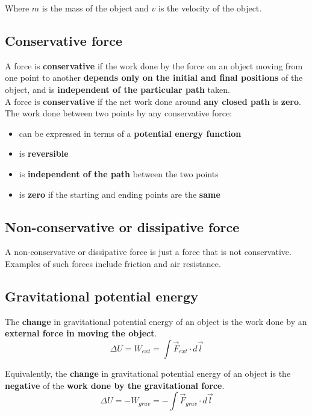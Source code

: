 \documentclass[11pt]{article}
\begin{document}
Where \(m\) is the mass of the object and \(v\) is the velocity of the object.

\subsection{Conservative force}
\label{sec:org4c093e1}
A force is \textbf{conservative} if the work done by the force on an object moving from one point to another \textbf{depends only on the initial and final positions} of the object, and is \textbf{independent of the particular path} taken.
\\[0pt]

A force is \textbf{conservative} if the net work done around \textbf{any closed path} is \textbf{zero}.
\\[0pt]

The work done between two points by any conservative force:
\begin{itemize}
\item can be expressed in terms of a \textbf{potential energy function}
\item is \textbf{reversible}
\item is \textbf{independent of the path} between the two points
\item is \textbf{zero} if the starting and ending points are the \textbf{same}
\end{itemize}

\subsection{Non-conservative or dissipative force}
\label{sec:orgee6e9a1}
A non-conservative or dissipative force is just a force that is not conservative. Examples of such forces include friction and air resistance.

\subsection{Gravitational potential energy}
\label{sec:org9611cf8}
The \textbf{change} in gravitational potential energy of an object is the work done by an \textbf{external force in moving the object}.
\[\Delta U = W_{ext} = \int \vec{F}_{ext} \cdot d \vec{l}\]

Equivalently, the \textbf{change} in gravitational potential energy of an object is the \textbf{negative} of the \textbf{work done by the gravitational force}.
\[\Delta U = -W_{grav} = -\int \vec{F}_{grav} \cdot d \vec{l}\]
\end{document}
